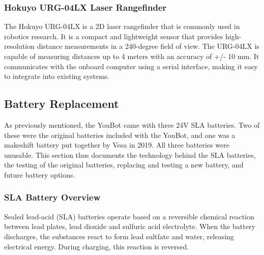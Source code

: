 \documentclass[a4paper, 12pt]{article}
\newif\ifshownotes
\newcommand{\notes}[1]{\ifshownotes\textcolor{blue}{#1}\fi}
\begin{document}
    \notes{discuss the libfreenect library, how to install it, and how it could be used within ROS.}


    \subsubsection{Hokuyo URG-04LX Laser Rangefinder}

    The Hokuyo URG-04LX is a 2D laser rangefinder that is commonly used in robotics research. It is a compact and lightweight sensor that provides high-resolution distance measurements in a 240-degree field of view. The URG-04LX is capable of measuring distances up to 4 meters with an accuracy of +/- 10 mm. It communicates with the onboard computer using a serial interface, making it easy to integrate into existing systems.

    \notes{discuss installing the drivers and whatnot, and how to use it within ROS and rqt.}



    \subsection{Battery Replacement}
    \label{sec:battery-replacement}



    \notes{draft 1, 11.05 12pm\\
    Here are some good web pages about the Slealed Lead Acid (SLA) batteries:
https://batterymasters.co.uk/blog/post/How%
and
https://www.power-sonic.com/blog/how-to-charge-a-lead-acid-battery/
and
https://www.powerstream.com/SLA.htm}

    As previously mentioned, the YouBot came with three 24V SLA batteries. Two of these were the original batteries included with the YouBot, and one was a makeshift battery put together by Vesa in 2019. All three batteries were unusable. This section thus documents the technology behind the SLA batteries, the testing of the original batteries, replacing and testing a new battery, and future battery options. 

    \subsubsection{SLA Battery Overview}

    Sealed lead-acid (SLA) batteries operate based on a reversible chemical reaction between lead plates, lead dioxide and sulfuric acid electrolyte. When the battery discharges, the substances react to form lead sultfate and water, releasing electrical energy. During charging, this reaction is reversed.
\end{document}
